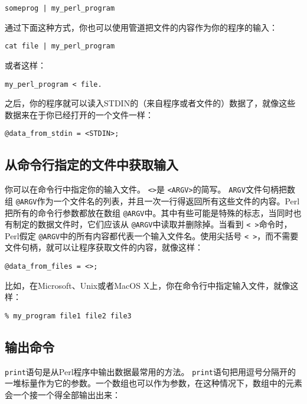 \begin{lstlisting}
someprog | my_perl_program 
\end{lstlisting}

通过下面这种方式，你也可以使用管道把文件的内容作为你的程序的输入：

\begin{lstlisting}
cat file | my_perl_program 
\end{lstlisting}

或者这样：

\begin{lstlisting}
my_perl_program < file.
\end{lstlisting}

之后，你的程序就可以读入STDIN的（来自程序或者文件的）数据了，就像这些数据来在于你已经打开的一个文件一样：

\begin{lstlisting}
@data_from_stdin = <STDIN>;
\end{lstlisting}

\subsection{从命令行指定的文件中获取输入}
你可以在命令行中指定你的输入文件。 \verb|<>|是 \verb|<ARGV>|的简写。 \verb|ARGV|文件句柄把数组 \verb|@ARGV|作为一个文件名的列表，并且一次一行得返回所有这些文件的内容。Perl把所有的命令行参数都放在数组 \verb|@ARGV|中。其中有些可能是特殊的标志，当同时也有制定的数据文件时，它们应该从 \verb|@ARGV|中读取并删除掉。当看到 \verb|< >|命令时，Perl假定 \verb|@ARGV|中的所有内容都代表一个输入文件名。使用尖括号 \verb|< >|，而不需要文件句柄，就可以让程序获取文件的内容，就像这样：

\begin{lstlisting}
@data_from_files = <>;
\end{lstlisting}

比如，在Microsoft、Unix或者MacOS X上，你在命令行中指定输入文件，就像这样：

\begin{lstlisting}
% my_program file1 file2 file3
\end{lstlisting}

\subsection{输出命令}
 \verb|print|语句是从Perl程序中输出数据最常用的方法。 \verb|print|语句把用逗号分隔开的一堆标量作为它的参数。一个数组也可以作为参数，在这种情况下，数组中的元素会一个接一个得全部输出出来：

